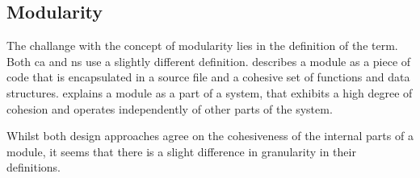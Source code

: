 \subsection{Modularity}

The challange with the concept of modularity lies in the definition of the term. Both
\gls{ca} and \gls{ns} use a slightly different definition.
\textcite[82]{robert_c_martin_clean_2018} describes a module as a piece of code that is 
encapsulated in a source file and a cohesive set of functions and data structures.
\textcite[22]{mannaert_normalized_2016} explains a module as a part of a system,
that exhibits a high degree of cohesion and operates independently of other parts of the
system.

Whilst both design approaches agree on the cohesiveness of the internal parts of a module,
it seems that there is a slight difference in granularity in their definitions.